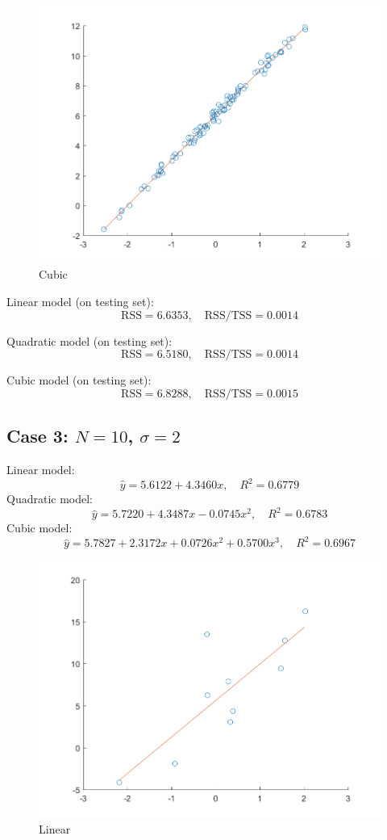 \documentclass{article}
\begin{document}
{{        \begin{figure}[H]
            \centering
            \includegraphics[width = 0.6\linewidth]{2-2-cubic-100-0.5.png}
            \caption{Cubic}
        \end{figure}

        Linear model (on testing set): $$\mathrm{RSS} = 6.6353, \quad \mathrm{RSS}/\mathrm{TSS} = 0.0014$$

        Quadratic model (on testing set): $$\mathrm{RSS} = 6.5180, \quad \mathrm{RSS}/\mathrm{TSS} = 0.0014$$

        Cubic model (on testing set): $$\mathrm{RSS} = 6.8288, \quad \mathrm{RSS}/\mathrm{TSS} = 0.0015$$
    }

    \subsection*{Case 3: $N=10$, $\sigma = 2$}
    {
        Linear model: $$\hat{y} = 5.6122 + 4.3460x ,\quad R^2 = 0.6779$$
        Quadratic model: $$\hat{y} = 5.7220 + 4.3487x - 0.0745x^2 ,\quad R^2 = 0.6783$$
        Cubic model: $$\hat{y} = 5.7827 + 2.3172x + 0.0726x^2 + 0.5700x^3 ,\quad R^2 = 0.6967$$

        \begin{figure}[H]
            \centering
            \includegraphics[width = 0.6\linewidth]{2-2-linear-10-2.0.png}
            \caption{Linear}
        \end{figure}

}}
\end{document}
